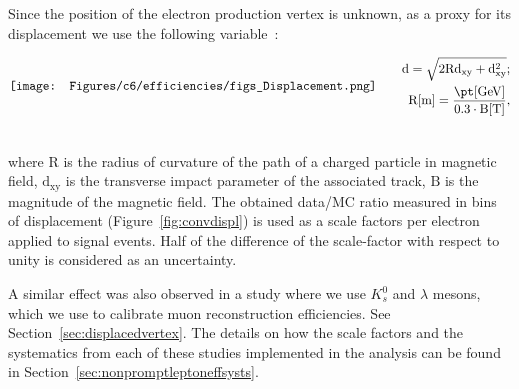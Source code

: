 Since the position of the \displ electron production vertex is
unknown, as a proxy for its displacement we use the following
variable~\cite{convz}:

\begin{align}
\vcenter{\hbox{\texttt{[image: Figures/c6/efficiencies/figs\_Displacement.png]}}}
&\qquad
\begin{aligned}
\mathrm{d = \sqrt{2Rd_{xy}+d_{xy}^2}};
\\
\mathrm{R [m] = \frac{\pt [GeV]}{0.3 \cdot B [T]}},
\end{aligned}\\
\vcenter{\hbox{\begin{minipage}{4cm}
\end{minipage}}}
& \notag
\end{align}

\noindent where $\mathrm{R}$ is the radius of curvature of the path of
a charged particle in magnetic field, $\mathrm{d_{xy}}$ is the
transverse impact parameter of the associated track, $\mathrm{B}$ is the
magnitude of the magnetic field. The obtained data/MC ratio measured in bins of displacement
(Figure~\ref{fig:convdispl}) is used as a scale factors per
electron applied to signal events.  Half of the difference of the
scale-factor with respect to unity is considered as an uncertainty.

A similar effect was also observed in a study where we use $K_s^0$  and $\lambda$ mesons, which we use to calibrate \displ muon reconstruction efficiencies. See Section~\ref{sec:displacedvertex}.
The details on how the scale factors and the systematics from each of these studies implemented in the analysis can be found in Section~\ref{sec:nonpromptleptoneffsysts}.

